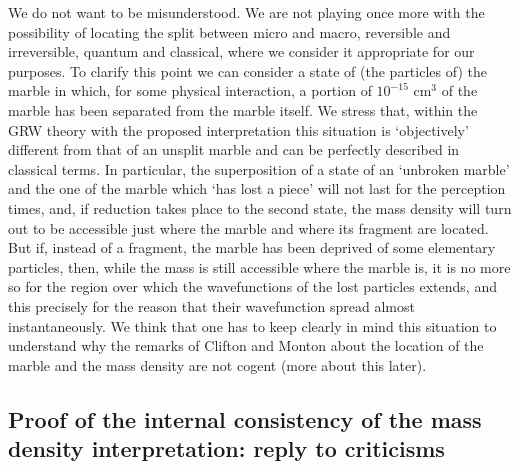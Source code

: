 \documentclass[10pt,a4paper]{article}
\begin{document}
We do not want to be misunderstood. We are not playing once more
with the possibility of locating the split between micro and
macro, reversible and irreversible, quantum and classical, where
we consider it appropriate for our purposes. To clarify this point
we can consider a state of (the particles of) the marble in which,
for some physical interaction, a portion of $10^{-15}$ cm$^{3}$ of
the marble has been separated from the marble itself. We stress
that, within the GRW theory with the proposed interpretation this
situation is `objectively' different from that of an unsplit
marble and can be perfectly described in classical terms. In
particular, the superposition of a state of an `unbroken marble'
and the one of the marble which `has lost a piece' will not last
for the perception times, and, if reduction takes place to the
second state, the mass density will turn out to be accessible just
where the marble and where its fragment are located. But if,
instead of a fragment, the marble has been deprived of some
elementary particles, then, while the mass is still accessible
where the marble is, it is no more so for the region over which
the wavefunctions of the lost particles extends, and this
precisely for the reason that their wavefunction spread almost
instantaneously. We think that one has to keep clearly in mind
this situation  to understand why  the remarks of Clifton and
Monton about the location of the marble and the mass density are
not cogent (more about this later).

\subsection[Reply to criticisms]{Proof of the internal consistency of
the mass density interpretation: reply to criticisms}
\label{sec135}
\end{document}
